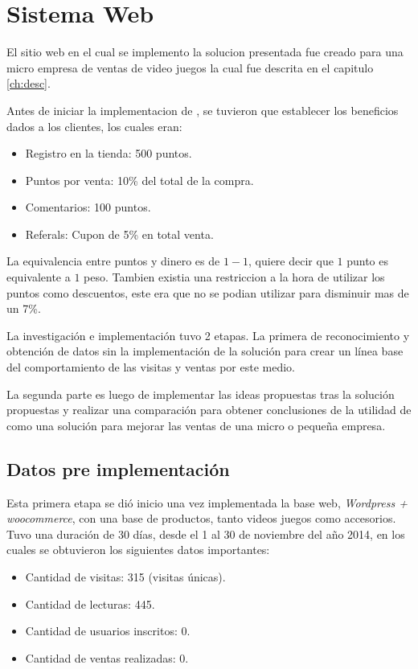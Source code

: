 \section{Sistema Web}

El sitio web en el cual se implemento la solucion presentada fue creado para una micro empresa de
ventas de video juegos la cual fue descrita en el capitulo \ref{ch:desc}.

Antes de iniciar la implementacion de {\GAM}, se tuvieron que establecer los beneficios dados a los 
clientes, los cuales eran:

\begin{itemize}

\item Registro en la tienda: 500 puntos.
\item Puntos por venta: 10\% del total de la compra.
\item Comentarios: 100 puntos.
\item Referals: Cupon de 5\% en total venta.

\end{itemize}

La equivalencia entre puntos y dinero es de $1-1$, quiere decir que $1$ punto es equivalente a 
$1$ peso. Tambien existia una restriccion a la hora de utilizar los puntos como descuentos, este 
era que no se podian utilizar para disminuir mas de un 7\%.

La investigación e implementación tuvo 2 etapas. La primera de reconocimiento y obtención de datos
 sin la implementación de la solución para crear un línea base del comportamiento de las visitas 
y ventas por este medio.

La segunda parte es luego de implementar las ideas propuestas tras la solución
propuestas y realizar una comparación para obtener conclusiones de la utilidad de
{\GAM} como una solución para mejorar las ventas de una micro o pequeña empresa.

\subsection{Datos pre implementación {\GAM}}

Esta primera etapa se dió inicio una vez implementada la base web,
\emph{Wordpress + woocommerce}, con una base de productos, tanto videos juegos como
accesorios.
Tuvo una duración de 30 días, desde el 1 al 30 de noviembre del año 2014,
en los cuales se obtuvieron los siguientes datos importantes:


\begin{itemize}
    \item Cantidad de visitas: 315 (visitas únicas).
    \item Cantidad de lecturas: 445.
    \item Cantidad de usuarios inscritos: 0.
    \item Cantidad de ventas realizadas: 0.
\end{itemize}

